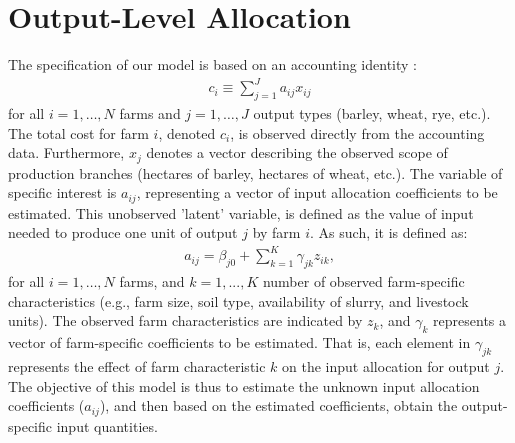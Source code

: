 \documentclass[12pt]{article}
\begin{document}
\section{Output-Level Allocation}
The specification of our model is based on an accounting identity \citep{henningsen2023}:
\begin{align}
    c_i \equiv \sum_{j=1}^J a_{ij} x_{ij} 
    \label{eq:accountingID}
\end{align}
for all $i=1,…,N$ farms and $j=1,…,J$ output types (barley, wheat, rye, etc.). 
The total cost for farm $i$, denoted $c_i$, is observed directly from the accounting data. 
Furthermore, $x_j$ denotes a vector describing the observed scope of production branches (hectares of barley, hectares of wheat, etc.). 
The variable of specific interest is $a_{ij}$, representing a vector of input allocation coefficients to be estimated. 
This unobserved 'latent' variable, is defined as the value of input needed to produce one unit of output $j$ by farm $i$. 
As such, it is defined as: 
\begin{align}
a_{ij} = \beta_{j0}+ \sum_{k=1}^{K}\gamma_{jk}z_{ik},
\end{align}
for all $i=1,…,N$ farms, and $k=1,...,K$ number of observed farm-specific characteristics (e.g., farm size, soil type, availability of slurry, and livestock units). 
The observed farm characteristics are indicated by $z_k$,
and $\gamma_k$ represents a vector of  farm-specific coefficients to be estimated.
That is, each element in $\gamma_{jk}$ represents the effect of farm characteristic $k$ on the input allocation for output $j$. 
\\[0.25cm]
The objective of this model is thus to estimate the unknown input allocation coefficients ($a_{ij}$), and then based on the estimated coefficients, obtain the output-specific input quantities.
\end{document}
